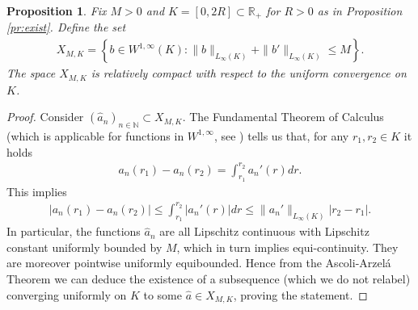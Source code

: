 \documentclass[A4paper,11pt]{article}
\newtheorem{proposition}[theorem]{Proposition}
\theoremstyle{definition}
\newcommand{\N}{\mathbb{N}}
\begin{document}
\begin{proposition}\label{XMdef}
Fix $M > 0$ and $K=[0,2R] \subset  \mathbb R_+$ for $R>0$ as in Proposition \ref{pr:exist}. Define the set
\begin{align*}
X_{M,K} = \left\{b \in W^{1,\infty}(K) :
 \|b\|_{L_{\infty}(K)} + \|b'\|_{L_{\infty}(K)} \leq M
 \right\}.
\end{align*}
The space $X_{M,K}$ is relatively compact with respect to the uniform convergence on $K$.
\end{proposition}
\begin{proof}
Consider $(\widehat a_n)_{n \in \N} \subset X_{M,K}$. The Fundamental Theorem of Calculus (which is applicable for functions in $W^{1,\infty}$, see \cite[Theorem 2.8]{AFP00}) tells us that, for any $r_1,r_2 \in K$ it holds
	\begin{align*}
		a_n(r_1)-a_n(r_2)=\int_{r_1}^{r_2}a_n'(r)dr.
	\end{align*}
	This implies
	\begin{align*}
		\bigl|a_n(r_1)-a_n(r_2)\bigr|\leq\int_{r_1}^{r_2}|a_n'(r)|dr
			\leq \|a_n'\|_{L_\infty(K)}|r_2-r_1|.
	\end{align*}
	In particular, the functions $\widehat a_n$ are all Lipschitz continuous with Lipschitz constant uniformly bounded by
	$M$, which in turn implies equi-continuity. They are moreover pointwise uniformly equibounded.
Hence from the Ascoli-Arzel\'a Theorem we can deduce the existence of a subsequence (which we do not relabel) converging uniformly on $K$ to some $\widehat a \in X_{M,K}$, proving the statement.
\end{proof}
\end{document}
